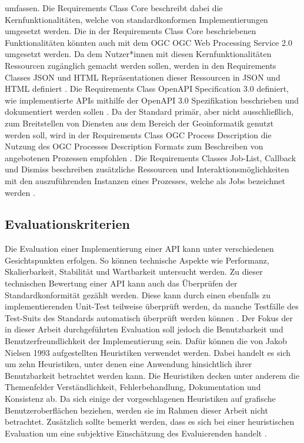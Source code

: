 umfassen.  
Die Requirements Class Core beschreibt dabei die Kernfunktionalitäten, welche 
von standardkonformen Implementierungen umgesetzt werden. Die in der Requirements Class Core beschriebenen Funktionalitäten könnten auch mit dem 
OGC OGC Web Processing Service 2.0 umgesetzt werden.
Da dem Nutzer*innen mit diesen Kernfunktionalitäten Ressourcen zugänglich gemacht werden sollen, werden in den 
Requirements Classes JSON und HTML Repräsentationen dieser Ressourcen in JSON und HTML definiert \cite{ogc_api_processes_core}. 
Die Requirements Class OpenAPI Specification 3.0 definiert, wie implementierte APIs mithilfe der OpenAPI 3.0 Spezifikation beschrieben 
und dokumentiert werden sollen \cite{ogc_api_processes_core}.
Da der Standard primär, aber nicht ausschließlich, zum Breitstellen von Diensten aus dem Bereich der Geoinformatik genutzt werden 
soll, wird in der Requirements Class OGC Process Description die Nutzung des OGC Processes Description Formats zum Beschreiben von 
angebotenen Prozessen empfohlen \cite{ogc_api_processes_core}. 
Die Requirements Classes Job-List, Callback und Dismiss beschreiben zusätzliche Ressourcen und Interaktionsmöglichkeiten 
mit den auszuführenden Instanzen eines Prozesses, welche als Jobs bezeichnet werden \cite{ogc_api_processes_core}.

\subsection{Evaluationskriterien}
Die Evaluation einer Implementierung einer API kann unter verschiedenen Gesichtspunkten erfolgen. So können technische Aspekte wie Performanz, Skalierbarkeit,
Stabilität und Wartbarkeit untersucht werden. Zu dieser technischen Bewertung einer API kann auch das Überprüfen der Standardkonformität gezählt werden. 
Diese kann durch einen ebenfalls zu implementierenden Unit-Test teilweise überprüft werden, da manche Testfälle des Test-Suits des Standards automatisch überprüft
werden können \cite{ogc_api_processes_core}. 
Der Fokus der in dieser Arbeit durchgeführten Evaluation soll jedoch die Benutzbarkeit und Benutzerfreundlichkeit der 
Implementierung sein. Dafür können die von Jakob Nielsen 1993 aufgestellten Heuristiken verwendet werden. Dabei handelt es sich um zehn Heuristiken, unter denen 
eine Anwendung hinsichtlich ihrer Benutzbarkeit betrachtet werden kann. 
Die Heuristiken decken unter anderem die Themenfelder Verständlichkeit, Fehlerbehandlung, 
Dokumentation und Konsistenz ab. Da sich einige der vorgeschlagenen Heuristiken auf grafische Benutzeroberflächen beziehen, werden sie im Rahmen dieser Arbeit 
nicht betrachtet. Zusätzlich sollte bemerkt werden, dass es sich bei einer heuristischen Evaluation um eine subjektive Einschätzung des  
Evaluierenden handelt \cite{usability_engineering,heuristics_website}. 




